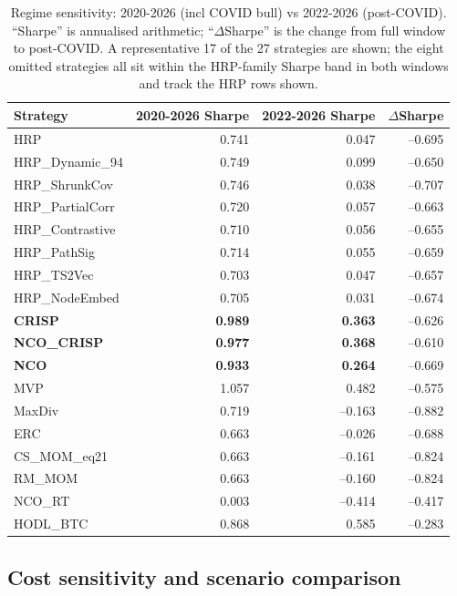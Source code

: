\documentclass[11pt,a4paper]{article}
\begin{document}
\begin{table}[H]
\centering\small
\caption{Regime sensitivity: 2020-2026 (incl COVID bull) vs 2022-2026 (post-COVID).
``Sharpe'' is annualised arithmetic; ``$\Delta$Sharpe'' is the change from full window
to post-COVID. A representative 17 of the 27 strategies are shown; the
eight omitted strategies all sit within the HRP-family Sharpe band in
both windows and track the HRP rows shown.}
\label{tab:regime}
\begin{tabular}{lrrr}
\toprule
Strategy            & 2020-2026 Sharpe & 2022-2026 Sharpe & $\Delta$Sharpe\\
\midrule
HRP                 &  0.741 &  0.047 & --0.695\\
HRP\_Dynamic\_94    &  0.749 &  0.099 & --0.650\\
HRP\_ShrunkCov      &  0.746 &  0.038 & --0.707\\
HRP\_PartialCorr    &  0.720 &  0.057 & --0.663\\
HRP\_Contrastive    &  0.710 &  0.056 & --0.655\\
HRP\_PathSig        &  0.714 &  0.055 & --0.659\\
HRP\_TS2Vec         &  0.703 &  0.047 & --0.657\\
HRP\_NodeEmbed      &  0.705 &  0.031 & --0.674\\
\textbf{CRISP}      &  \textbf{0.989} &  \textbf{0.363} & --0.626\\
\textbf{NCO\_CRISP} &  \textbf{0.977} &  \textbf{0.368} & --0.610\\
\textbf{NCO}        &  \textbf{0.933} &  \textbf{0.264} & --0.669\\
MVP                 &  1.057 &  0.482 & --0.575\\
MaxDiv              &  0.719 & --0.163 & --0.882\\
ERC                 &  0.663 & --0.026 & --0.688\\
CS\_MOM\_eq21       &  0.663 & --0.161 & --0.824\\
RM\_MOM             &  0.663 & --0.160 & --0.824\\
NCO\_RT             &  0.003 & --0.414 & --0.417\\
HODL\_BTC           &  0.868 &  0.585 & --0.283\\
\bottomrule
\end{tabular}
\end{table}

\subsection{Cost sensitivity and scenario comparison}
\end{document}
